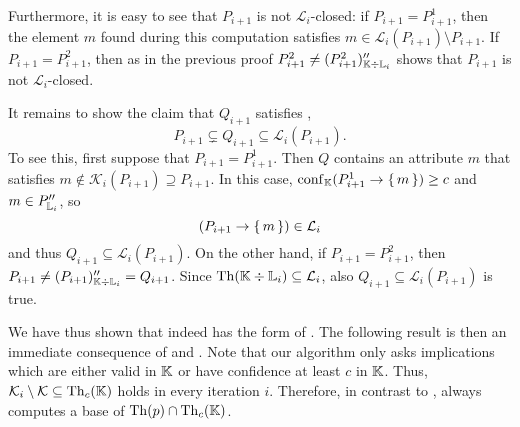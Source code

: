Furthermore, it is easy to see that $P_{i+1}$ is not $\mathcal{L}_{i}$-closed: if $P_{i+1}
= P_{i+1}^{1}$, then the element $m$ found during this computation satisfies $m \in
\mathcal{L}_{i}(P_{i+1}) \setminus P_{i+1}$.  If $P_{i+1} = P_{i+1}^{2}$, then as in the
previous proof $P_{i+1}^{2} \neq (P_{i+1}^{2})_{{\mathbb{K}} \div {\ensuremath{\mathbb{L}}}_{i}}''$ shows that
$P_{i+1}$ is not $\mathcal{L}_{i}$-closed.

It remains to show the claim that $Q_{i+1}$ satisfies , \ie
\begin{equation*}
  P_{i+1} \subsetneq Q_{i+1} \subseteq \mathcal{L}_{i}(P_{i+1}).
\end{equation*}
To see this, first suppose that $P_{i+1} = P_{i+1}^{1}$.  Then $Q$ contains an attribute
$m$ that satisfies $m \notin \mathcal{K}_{i}(P_{i+1}) \supseteq P_{i+1}$.  In this case,
$\operatorname{conf}_{{\mathbb{K}}}(P_{i+1}^{1} \to {\ensuremath{\{\,m\,\}}}) \ge c$ and $m \in P_{{\mathbb{L}}_{i}}''$, so
\begin{equation*}
  (P_{i+1} \to {\ensuremath{\{\,m\,\}}}) \in \mathcal{L}_{i}
\end{equation*}
and thus $Q_{i+1} \subseteq \mathcal{L}_{i}(P_{i+1})$.  On the other hand, if $P_{i+1} =
P_{i+1}^{2}$, then $P_{i+1} \neq (P_{i+1})_{{\mathbb{K}} \div {\ensuremath{\mathbb{L}}}_{i}}'' = Q_{i+1}$.  Since
$\operatorname{Th}({\mathbb{K}} \div {\ensuremath{\mathbb{L}}}_{i}) \subseteq \mathcal{L}_{i}$, also $Q_{i+1} \subseteq
\mathcal{L}_{i}(P_{i+1})$ is true.

We have thus shown that 
indeed has the form of .  The following
result is then an immediate consequence of
 and
.  Note that our
algorithm only asks implications which are either valid in ${\mathbb{K}}$ or have confidence at
least $c$ in ${\mathbb{K}}$.  Thus, $\mathcal{K}_{i} \setminus \mathcal{K} \subseteq
\operatorname{Th}_{c}({\mathbb{K}})$ holds in every iteration $i$.  Therefore, in contrast to
,
 always computes a base of
$\operatorname{Th}(p) \cap \operatorname{Th}_{c}({\mathbb{K}})$.

